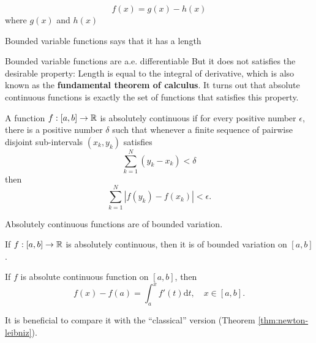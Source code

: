 \begin{theorem}
    \begin{equation*}
        f(x)=g(x)-h(x)
    \end{equation*}
    where $g(x)$ and $h(x)$ 
\end{theorem}
Bounded variable functions says that it has a length


Bounded variable functions are a.e. differentiable
But it does not satisfies the desirable property: Length is equal to the integral of derivative,
which is also known as the \textbf{fundamental theorem of calculus}.
It turns out that absolute continuous functions is exactly the set of functions that satisfies this property.


\begin{example}
    
\end{example}



\begin{definition}
    A function $f:[a,b]\to \mathbb{R}$ is absolutely continuous if for every positive number $\epsilon$,  there is a positive number $\delta$ such that 
    whenever a finite sequence of pairwise disjoint sub-intervals $(x_k,y_k)$ satisfies
    $$ \sum_{k=1}^{N}(y_k-x_k)<\delta $$
    then $$\sum_{k=1}^{N}|f(y_k)-f(x_k)|<\epsilon.$$
\end{definition}


Absolutely continuous functions are of bounded variation.
\begin{proposition}
    If $f:[a,b]\to\mathbb{R}$ is absolutely continuous, then it is of bounded variation on $[a,b]$.
\end{proposition}

\begin{theorem}\label{thm:abs-cont}
    If $f$ is absolute continuous function on $[a,b]$, then 
    \begin{equation*}
        f(x)-f(a)=\int_{a}^{x}f'(t)\mathrm{d}t,\quad x\in [a,b].
    \end{equation*}
\end{theorem}

It is beneficial to compare it with the ``classical'' version (Theorem \ref{thm:newton-leibniz}).






